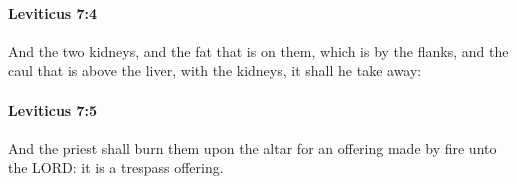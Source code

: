 		\paragraph{Leviticus 7:4} %
			\label{LEVITICUS-7-4}

			And the two kidneys, and the fat that is on them, which is by the flanks, and the caul that is above the liver, with the kidneys, it shall he take away:


		\paragraph{Leviticus 7:5} %
			\label{LEVITICUS-7-5}

			And the priest shall burn them upon the altar for an offering made by fire unto the LORD: it is a trespass offering.


